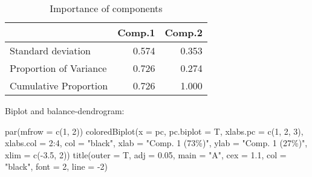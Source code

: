 \documentclass[
  12pt,
]{article}
\newenvironment{Shaded}{\begin{snugshade}}{\end{snugshade}}
\newcommand{\AttributeTok}[1]{\textcolor[rgb]{0.77,0.63,0.00}{#1}}
\newcommand{\DecValTok}[1]{\textcolor[rgb]{0.00,0.00,0.81}{#1}}
\newcommand{\FloatTok}[1]{\textcolor[rgb]{0.00,0.00,0.81}{#1}}
\newcommand{\FunctionTok}[1]{\textcolor[rgb]{0.00,0.00,0.00}{#1}}
\newcommand{\NormalTok}[1]{#1}
\newcommand{\SpecialCharTok}[1]{\textcolor[rgb]{0.00,0.00,0.00}{#1}}
\newcommand{\StringTok}[1]{\textcolor[rgb]{0.31,0.60,0.02}{#1}}
\begin{document}
\begin{table}

\caption{\label{tab:prsh-CoDa-PCA}Importance of components}
\centering
\begin{tabular}[t]{l|r|r}
\hline
  & Comp.1 & Comp.2\\
\hline
Standard deviation & 0.574 & 0.353\\
\hline
Proportion of Variance & 0.726 & 0.274\\
\hline
Cumulative Proportion & 0.726 & 1.000\\
\hline
\end{tabular}
\end{table}

Biplot and balance-dendrogram:

\begin{Shaded}
\begin{Highlighting}[]
\FunctionTok{par}\NormalTok{(}\AttributeTok{mfrow =} \FunctionTok{c}\NormalTok{(}\DecValTok{1}\NormalTok{, }\DecValTok{2}\NormalTok{))}
\FunctionTok{coloredBiplot}\NormalTok{(}\AttributeTok{x =}\NormalTok{ pc,}
              \AttributeTok{pc.biplot =}\NormalTok{ T,}
              \AttributeTok{xlabs.pc =} \FunctionTok{c}\NormalTok{(}\DecValTok{1}\NormalTok{, }\DecValTok{2}\NormalTok{, }\DecValTok{3}\NormalTok{),}
              \AttributeTok{xlabs.col =} \DecValTok{2}\SpecialCharTok{:}\DecValTok{4}\NormalTok{,}
              \AttributeTok{col =} \StringTok{"black"}\NormalTok{,}
              \AttributeTok{xlab =} \StringTok{"Comp. 1 (73\%)"}\NormalTok{,}
              \AttributeTok{ylab =} \StringTok{"Comp. 1 (27\%)"}\NormalTok{,}
              \AttributeTok{xlim =} \FunctionTok{c}\NormalTok{(}\SpecialCharTok{{-}}\FloatTok{3.5}\NormalTok{, }\DecValTok{2}\NormalTok{))}
\FunctionTok{title}\NormalTok{(}\AttributeTok{outer =}\NormalTok{ T,}
      \AttributeTok{adj =} \FloatTok{0.05}\NormalTok{,}
      \AttributeTok{main =} \StringTok{"A"}\NormalTok{,}
      \AttributeTok{cex =} \FloatTok{1.1}\NormalTok{,}
      \AttributeTok{col =} \StringTok{"black"}\NormalTok{,}
      \AttributeTok{font =} \DecValTok{2}\NormalTok{,}
      \AttributeTok{line =} \SpecialCharTok{{-}}\DecValTok{2}\NormalTok{)}


\end{Highlighting}
\end{Shaded}
\end{document}
